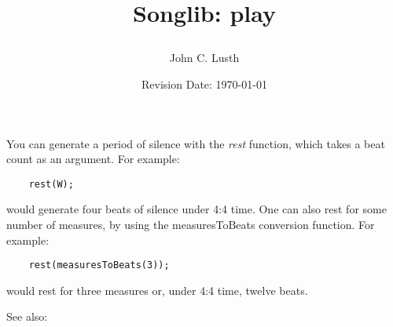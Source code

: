 \documentclass{article}
\title{Songlib: play\\
\date{Revision Date: \today}}
\author{John C. Lusth}
\begin{document}
\maketitle

\W\subsubsection*{}
\W\htmlrule

You can generate a period of silence with the {\it rest} function,
which
takes a beat count as an argument.
For example:

\begin{verbatim}
    rest(W);
\end{verbatim}

would generate four beats of silence under 4:4 time.
One can also rest for some number of measures, by using
the measuresToBeats conversion function. For example:

\begin{verbatim}
    rest(measuresToBeats(3));
\end{verbatim}

would rest for three measures or, under 4:4 time, twelve beats.

\htmlrule
    
See also:
\end{document}
